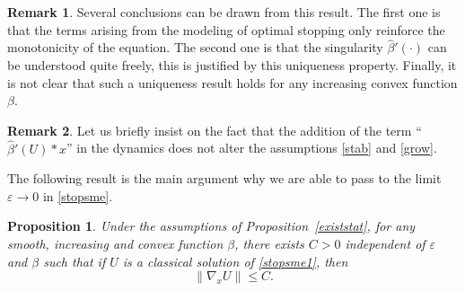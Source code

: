 \documentclass[10pt]{amsart}
\let\epsilon\varepsilon
\newtheorem{Prop}{Proposition}[section]
\theoremstyle{definition}
\newtheorem{Rem}{Remark}[section]
\begin{document}
\begin{Rem}
Several conclusions can be drawn from this result. The first one is that the terms arising from the modeling of optimal stopping only reinforce the monotonicity of the equation. The second one is that the singularity $\hat{\beta}'(\cdot)$ can be understood quite freely, this is justified by this uniqueness property. Finally, it is not clear that such a uniqueness result holds for any increasing convex function $\beta$.
\end{Rem}
\begin{Rem}
Let us briefly insist on the fact that the addition of the term \hbox{``$\hat{\beta}'(U)*x$''} in the dynamics does not alter the assumptions \ref{stab} and \ref{grow}.
\end{Rem}
The following result is the main argument why we are able to pass to the limit $\epsilon \to 0$ in \eqref{stopsme}.
\begin{Prop}\label{estimatestop}
Under the assumptions of Proposition~\ref{existstat}, for any smooth, increasing and convex function $\beta$, there exists $C > 0$ independent of $ \epsilon$ and $\beta$ such that if $U$ is a classical solution of \eqref{stopsme1}, then
\begin{equation}\label{estint}
\|\nabla_x U\| \leq C.
\end{equation}
\end{Prop}
\end{document}
